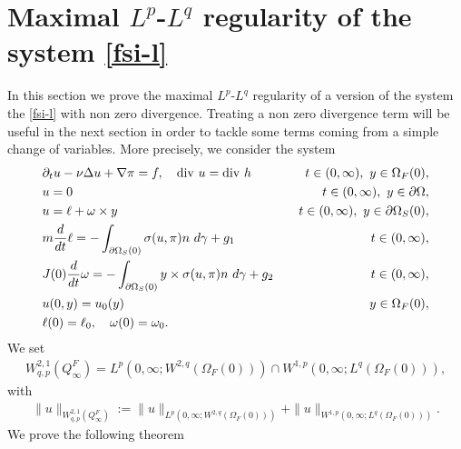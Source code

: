 \documentclass[12pt,a4paper,reqno]{amsart}
\theoremstyle{definition}
\theoremstyle{remark}
\numberwithin{equation}{section}
\newcommand{\oso}{\Omega_{S}(0)}
\newcommand{\ofo}{\Omega_{F}(0)}
\newcommand{\poso}{\partial\oso}
\begin{document}
\section{Maximal $L^{p}$-$L^{q}$ regularity of the system \eqref{fsi-l} } \label{sec:maxlp}

In this section we prove the maximal $L^{p}$-$L^{q}$ regularity of a version of the system  the \eqref{fsi-l} with non zero divergence. Treating a non zero divergence term will be useful in the next section in order to tackle some terms coming from a simple change of variables. More precisely, we consider the system
\begin{alignat}{2} \label{fsi-l-d}
&\partial_{t} u - \nu \Delta u + \nabla \pi  = f, \quad \mathrm{div} \ u = \mathrm{div}\  h  & \quad t \in   (0,\infty),  \ y \in  \ofo, \notag \\
& u = 0  & t \in  (0,\infty), \ y \in \partial\Omega,\notag  \\
&  u  = \ell  + \omega \times y & \quad t\in  (0,\infty), \  y \in  \poso, \notag \\
&  m\frac{d}{dt} \ell =  -  \int_{\partial \Omega_{S}(0)}  \sigma(u,\pi) n \ d\gamma  +  g_{1} & \quad t \in (0,\infty), \\
&  J(0)\frac{d}{dt} \omega =  - \int_{\partial \Omega_{S}(0)} y \times   \sigma(u,\pi)n \ d\gamma + g_{2} &  \quad t \in (0,\infty), \notag \\
&  u (0,y) = u_{0}(y) & y\in   \Omega_{F}(0),  \notag \\
&  \ell(0) = \ell_{0}, \quad  \omega(0) = \omega_{0}. \notag
\end{alignat}
We set
\begin{align*}
W^{2,1}_{q,p} (Q^{F}_{\infty}) =  L^{p}(0,\infty;W^{2,q}(\ofo)) \cap W^{1,p}(0,\infty;L^{q}(\ofo)),
\end{align*}
with
\begin{align*}
\|u\|_{W^{2,1}_{q,p} (Q^{F}_{\infty})} := \|u\|_{L^{p}(0,\infty;W^{2,q}(\ofo))} + \|u\|_{W^{1,p}(0,\infty;L^{q}(\ofo))}.
\end{align*}
We prove the following theorem
\end{document}
